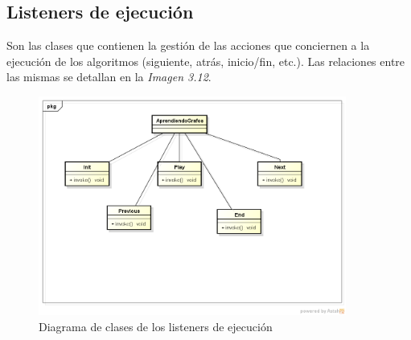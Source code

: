 \documentclass{book}
\begin{document}
\subsection{Listeners de ejecución}

Son las clases que contienen la gestión de las acciones que conciernen a la ejecución de los algoritmos (siguiente, atrás, inicio/fin, etc.).
Las relaciones entre las mismas se detallan en la \textit{Imagen 3.12}.
\begin{figure}[H]
	\centering
	\includegraphics[width=0.9\textwidth]{images/ejecucion.png}
	\medskip
	\caption{Diagrama de clases de los listeners de ejecución}
	\medskip
\end{figure}
\bigskip
\newpage
\end{document}
